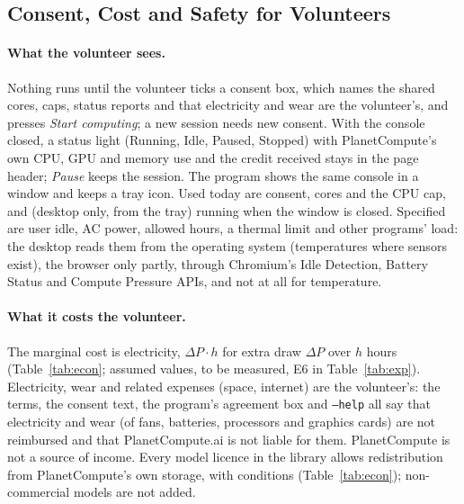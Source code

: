 \documentclass[11pt,a4paper]{article}
\theoremstyle{definition}
\theoremstyle{plain}
\begin{document}
\subsection{Consent, Cost and Safety for Volunteers}\label{sec:volunteer}

\paragraph{What the volunteer sees.} Nothing runs until the volunteer ticks a consent box, which names the
shared cores, caps, status reports and that electricity and wear are the volunteer's, and presses \emph{Start
computing}; a new session needs new consent. With the console closed, a status light (Running, Idle, Paused, Stopped) with PlanetCompute's own CPU, GPU and
memory use and the credit received stays in the page header; \emph{Pause} keeps the session. The program shows the same console
in a window and keeps a tray icon. Used today are consent, cores and the CPU cap, and (desktop only, from the
tray) running when the window is closed. Specified are user idle, AC power, allowed hours, a thermal limit and
other programs' load: the desktop reads them from the operating system (temperatures where sensors exist), the
browser only partly, through Chromium's Idle Detection, Battery Status and Compute Pressure APIs, and not at all for
temperature.

\paragraph{What it costs the volunteer.} The marginal cost is electricity, $\Delta P\cdot h$ for extra draw
$\Delta P$ over $h$ hours (Table~\ref{tab:econ}; assumed values, to be measured, E6 in
Table~\ref{tab:exp}). Electricity, wear and related expenses (space, internet) are the volunteer's: the terms, the consent text, the
program's agreement box and \texttt{--help} all say that electricity and wear (of fans, batteries, processors and graphics
cards) are not reimbursed and that PlanetCompute.ai is not liable for them.
PlanetCompute is not a source of income. Every model licence in the library allows redistribution from PlanetCompute's own storage, with
conditions (Table~\ref{tab:econ}); non-commercial models are not added.
\end{document}
